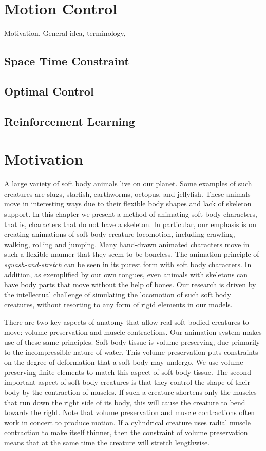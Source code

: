 \section{Motion Control}
Motivation, General idea, terminology, 
\subsection{Space Time Constraint}
\subsection{Optimal Control}
\subsection{Reinforcement Learning}

\section{Motivation}

A large variety of soft body animals live on our planet. Some examples of
such creatures are slugs, starfish, earthworms, octopus, and jellyfish. These
animals move in interesting ways due to their flexible body shapes and lack of
skeleton support. In this chapter we present a method of animating soft body characters, that
is, characters that do not have a skeleton.  In particular, our emphasis
is on creating animations of soft body creature locomotion, including
crawling, walking, rolling and jumping.  
Many hand-drawn animated characters move in such a flexible
manner that they seem to be boneless.  The animation principle of
\emph{squash-and-stretch} can be seen in its purest form with soft body
characters. In addition, as exemplified by our own tongues, even animals with
skeletons can have body parts that move without the help of
bones.  Our research is driven by the intellectual challenge of
simulating the locomotion of such soft body creatures, without resorting
to any form of rigid elements in our models.

There are two key aspects of anatomy that allow real soft-bodied creatures
to move: volume preservation and muscle contractions.  Our animation
system makes use of these same principles.  Soft body tissue is volume
preserving, due primarily to the incompressible nature of water.  This
volume preservation puts constraints on the degree of deformation that a
soft body may undergo.  We use volume-preserving finite elements to match
this aspect of soft body tissue.  The second important aspect of soft body
creatures is that they control the shape of their body by the contraction of
muscles.  If such a creature shortens only the muscles that run down the
right side of its body, this will cause the creature to bend towards the
right.  Note that volume preservation and muscle contractions often work
in concert to produce motion.  If a cylindrical creature uses radial
muscle contraction to make itself thinner, then the constraint of volume
preservation means that at the same time the creature will stretch
lengthwise.

